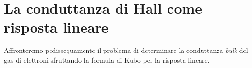 \documentclass[12pt,a4paper]{article}
\begin{document}



 

\section{La conduttanza di Hall come risposta lineare}
Affronteremo pedissequamente il problema di determinare la conduttanza \emph{bulk} del gas di elettroni sfruttando la formula di Kubo per la risposta lineare. 
\end{document}

